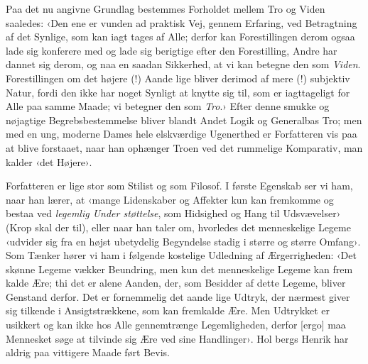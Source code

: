 \documentclass[12pt,a4paper,openany]{book}
\newcommand{\opage}[1]{\marginnote{\footnotesize\textit{[#1]}}}
\begin{document}
Paa det nu angivne Grundlag bestemmes Forholdet mellem
Tro og Viden saaledes: ‹Den ene er vunden ad praktisk Vej,
gennem Erfaring, ved Betragtning af det Synlige, som kan iagt\-%
tages af Alle; derfor kan Forestillingen derom ogsaa lade sig
\opage{24}konferere med og lade sig berigtige efter den Forestilling, Andre
har dannet sig derom, og naa en saadan Sikkerhed, at vi kan
betegne den som \emph{Viden}. Forestillingen om det højere (!) Aande\-%
lige bliver derimod af mere (!) subjektiv Natur, fordi den ikke
har noget Synligt at knytte sig til, som er iagttageligt for Alle
paa samme Maade; vi betegner den som \emph{Tro}.› Efter denne smukke
og nøjagtige Begrebsbestemmelse bliver blandt Andet Logik og
Generalbas Tro; men med en ung, moderne Dames hele
elskværdige Ugenerthed er Forfatteren vis paa at blive forstaaet,
naar han ophænger Troen ved det rummelige Komparativ,
man kalder ‹det Højere›.

Forfatteren er lige stor som Stilist og som Filosof. I første
Egenskab ser vi ham, naar han lærer, at ‹mange Lidenskaber og
Affekter kun kan fremkomme og bestaa ved \emph{legemlig Under\-%
støttelse}, som Hidsighed og Hang til Udsvævelser› (Krop skal
der til), eller naar han taler om, hvorledes det menneskelige
Legeme ‹udvider sig fra en højst ubetydelig Begyndelse stadig i
større og større Omfang›. Som Tænker hører vi ham i følgende
kostelige Udledning af Ærgerrigheden: ‹Det skønne Legeme
vækker Beundring, men kun det menneskelige Legeme kan frem\-%
kalde Ære; thi det er alene Aanden, der, som Besidder af dette
Legeme, bliver Genstand derfor. Det er fornemmelig det aande\-%
lige Udtryk, der nærmest giver sig tilkende i Ansigtstrækkene,
som kan fremkalde Ære. Men Udtrykket er usikkert og kan
ikke hos Alle gennemtrænge Legemligheden, derfor [ergo] maa
Mennesket søge at tilvinde sig Ære ved sine Handlinger›. Hol\-%
bergs Henrik har aldrig paa vittigere Maade ført Bevis.
\end{document}
